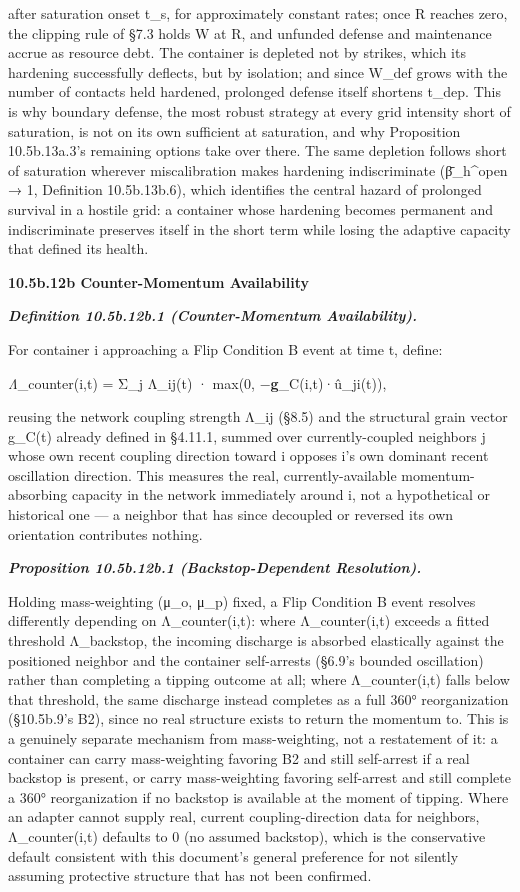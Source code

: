 \documentclass[
]{article}
\begin{document}
after saturation onset t\_s, for approximately constant rates; once R
reaches zero, the clipping rule of §7.3 holds W at R, and unfunded
defense and maintenance accrue as resource debt. The container is
depleted not by strikes, which its hardening successfully deflects, but
by isolation; and since W\_def grows with the number of
contacts held hardened, prolonged defense itself shortens t\_dep. This is
why boundary defense, the most robust strategy at every grid intensity
short of saturation, is not on its own sufficient at saturation, and why
Proposition 10.5b.13a.3's remaining options take over there. The same
depletion follows short of saturation wherever miscalibration makes
hardening indiscriminate (β̄\_h\^{}open → 1, Definition 10.5b.13b.6),
which identifies the central hazard of prolonged survival in a hostile
grid: a container whose hardening becomes permanent and indiscriminate
preserves itself in the short term while losing the adaptive capacity
that defined its health.

\textbf{10.5b.12b Counter-Momentum Availability}

\emph{\textbf{Definition 10.5b.12b.1 (Counter-Momentum Availability).}}

For container i approaching a Flip Condition B event at time t, define:

\emph{Λ}\_counter(i,t) = Σ\_j Λ\_ij(t) · max(0,
−\textbf{g}\_C(i,t)·û\_ji(t)),

reusing the network coupling strength Λ\_ij (§8.5) and the structural
grain vector g\_C(t) already defined in §4.11.1, summed over
currently-coupled neighbors j whose own recent coupling direction toward
i opposes i's own dominant recent oscillation direction. This measures
the real, currently-available momentum-absorbing capacity in the network
immediately around i, not a hypothetical or historical one --- a
neighbor that has since decoupled or reversed its own orientation
contributes nothing.

\emph{\textbf{Proposition 10.5b.12b.1 (Backstop-Dependent Resolution).}}

Holding mass-weighting (μ\_o, μ\_p) fixed, a Flip Condition B event
resolves differently depending on Λ\_counter(i,t): where Λ\_counter(i,t)
exceeds a fitted threshold Λ\_backstop, the incoming discharge is
absorbed elastically against the positioned neighbor and the container
self-arrests (§6.9's bounded oscillation) rather than completing a
tipping outcome at all; where Λ\_counter(i,t) falls below that
threshold, the same discharge instead completes as a full 360°
reorganization (§10.5b.9's B2), since no real structure exists to return
the momentum to. This is a genuinely separate mechanism from
mass-weighting, not a restatement of it: a container can carry
mass-weighting favoring B2 and still self-arrest if a real backstop is
present, or carry mass-weighting favoring self-arrest and still complete
a 360° reorganization if no backstop is available at the moment of
tipping. Where an adapter cannot supply real, current coupling-direction
data for neighbors, Λ\_counter(i,t) defaults to 0 (no assumed backstop),
which is the conservative default consistent with this document's
general preference for not silently assuming protective structure that
has not been confirmed.
\end{document}
